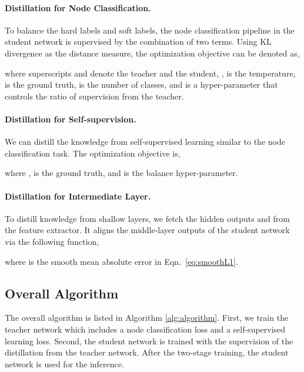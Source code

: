 \documentclass[letterpaper]{article} \usepackage{aaai22} \usepackage{times} \usepackage{helvet} \usepackage{courier} \usepackage[hyphens]{url} \usepackage{graphicx} \urlstyle{rm} \def\UrlFont{\rm} \usepackage{subfigure}
\begin{document}
	\paragraph{Distillation for Node Classification.}
	To balance the hard labels and soft labels, the node classification pipeline in the student network is supervised by the combination of two terms. Using KL divergence as the distance measure, the optimization objective can be denoted as,
	
	where superscripts  and  denote the teacher and the student, ,  is the temperature,  is the ground truth,  is the number of classes, and  is a hyper-parameter that controls the ratio of supervision from the teacher. 
	
	\paragraph{Distillation for Self-supervision.} 
	We can distill the knowledge from self-supervised learning similar to the node classification task. The optimization objective is,
	
	where ,  is the ground truth, and  is the balance hyper-parameter.
	
	\paragraph{Distillation for Intermediate Layer.}
	To distill knowledge from shallow layers, we fetch the hidden outputs  and  from the feature extractor. It aligns the middle-layer outputs of the student network via the following function,
	
	where  is the smooth mean absolute error in Eqn.~\eqref{eq:smoothL1}.
	
	\subsection{Overall Algorithm}
	The overall algorithm is listed in Algorithm \ref{alg:algorithm}. First, we train the teacher network which includes a node classification loss and a self-supervised learning loss. Second, the student network is trained with the supervision of the distillation from the teacher network. After the two-stage training, the student network is used for the inference.
	
\end{document}
